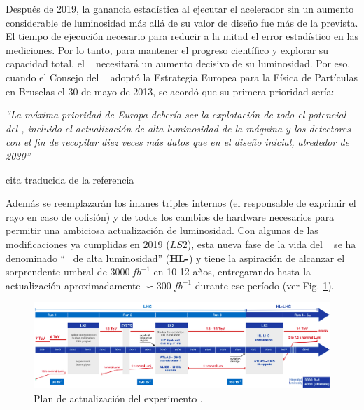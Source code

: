 Después de 2019, la ganancia estadística al ejecutar el acelerador sin un aumento considerable de luminosidad más allá de su valor de diseño fue más de la prevista. El tiempo de ejecución necesario para reducir a la mitad el error estadístico en las mediciones. Por lo tanto, para mantener el progreso científico y explorar su capacidad total, el \LHC ~ necesitará un aumento decisivo de su luminosidad. Por eso, cuando el Consejo del \CERN ~ adoptó la Estrategia Europea para la Física de Partículas en Bruselas el 30 de mayo de 2013, se acordó que su primera prioridad sería:

\begin{minipage}{0.9\linewidth}
\vspace{5pt}%
{\small }
\textit{``La máxima prioridad de Europa debería ser la explotación de todo el potencial del \LHC, incluido el actualización de alta luminosidad de la máquina y los detectores con el fin de recopilar diez veces más datos que en el diseño inicial, alrededor de 2030''}
\begin{flushright}
cita traducida de la referencia \cite{wells_upgraded_2015}
\end{flushright}
\vspace{5pt}%
\end{minipage}

Además se reemplazarán los imanes triples internos (el responsable de exprimir el rayo en caso de colisión) y de todos los cambios de hardware necesarios para permitir una ambiciosa actualización de luminosidad. Con algunas de las modificaciones ya cumplidas en 2019 ($LS2$), esta nueva fase de la vida del \LHC ~ se ha denominado ``\LHC ~ de alta luminosidad'' (\textbf{HL-}\LHC) y tiene la aspiración de alcanzar el sorprendente umbral de $3000~fb^{-1}$ en 10-12 años, entregarando hasta la actualización aproximadamente $\backsim 300~fb^{-1}$ durante ese período (ver Fig. \ref{cms_actualiza}).


\begin{figure}[h!]
\centering
\includegraphics[width=1\textwidth]{Analisis_y_Resultados/imagenes/CMS_upgrade.png}
\caption[Plan de actualización del experimento \LHC.]{Plan de actualización del experimento \LHC.\footnotemark}
\label{cms_actualiza}
\end{figure}

